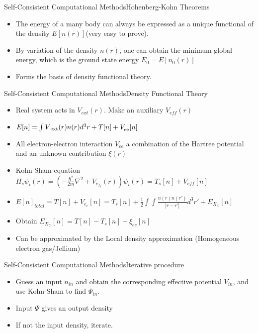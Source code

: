 \documentclass{beamer}
\begin{document}
\begin{frame}{Self-Consistent Computational Methods}{Hohenberg-Kohn Theorems}
  \begin{itemize}
      \item {The energy of a many body can always be expressed as a unique functional of the density $E[n(r)]$(very easy to prove).}
      \item{By variation of the density $n(r)$, one can obtain the minimum global energy, which is the ground state energy $E_0=E[n_0(r)]$}
      \item{Forms the basis of density functional theory.}
  \end{itemize}
\end{frame}
\begin{frame}{Self-Consistent Computational Methods}{Density Functional Theory}
  \begin{itemize}
        \item {Real system acts in $V_{ext}(r)$. Make an auxiliary $V_{eff}(r)$}
        \item{$E[n]=\int V\textsubscript{ext}(r)n(r)d^3r + T[n] + V_\textsubscript{ee}[n]$}
      \item{All electron-electron interaction $V_{ee}$ a combination of the Hartree potential and an unknown contribution $\xi(r)$}
      \item{Kohn-Sham equation $H_s \psi_i (r) = (-\frac{\hbar^2}{2m}\nabla^2 +V_e_f_f(r) ) \psi_i (r)=T_s[n]+V_{eff}[n]$}
      \item{$E[n]_{total}=T[n]+V_e_e[n] = T_s[n] + \frac{1}{2}\int \int \frac{n(r)n(r')}{|r-r'|}d^3 r' + E_X_C[n]$}
      \item{Obtain $E_X_C[n]=T[n] -T_s[n] + \xi_{ee}[n]$  }
      \item{Can be approximated by the Local density approximation (Homogeneous electron gas/Jellium)}
  \end{itemize}
\end{frame}
\begin{frame}{Self-Consistent Computational Methods}{Iterative procedure}
    \begin{itemize}
    \item{Guess an input $n_{in}$ and obtain the corresponding effective potential $V_{in}$, and use Kohn-Sham to find $\Psi_{in}$.}
\item{Input $\Psi$ gives an output density}
\item{If not the input density, iterate.}
\end{itemize}
\end{frame}
\end{document}
